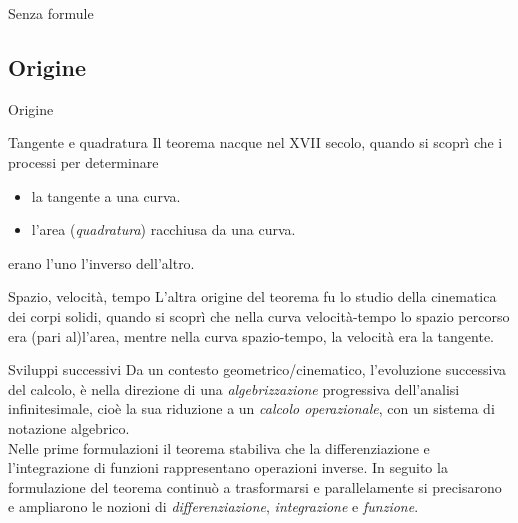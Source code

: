 \documentclass[8pt]{beamer}
\begin{document}
\begin{frame}{Senza formule}
\begin{center}
  \end{center}
\end{frame}

\subsection{Origine}
\begin{frame}{Origine}
  \begin{block}{Tangente e quadratura}
    Il teorema nacque nel XVII secolo, quando si scoprì che i processi per determinare
    \begin{itemize}
      \item
            la tangente a una curva.
      \item
            l'area (\textit{quadratura}) racchiusa da una curva.
    \end{itemize}
    erano l'uno l'inverso dell'altro.
  \end{block}

  \begin{block}{Spazio, velocità, tempo}
    L'altra origine del teorema fu lo studio della cinematica dei corpi solidi,
    quando si scoprì che nella curva velocità-tempo lo spazio percorso era (pari al)l'area,
    mentre nella curva spazio-tempo, la velocità era la tangente. 
  \end{block}

  \pause
  \begin{block}{Sviluppi successivi}
    Da un contesto geometrico/cinematico, l'evoluzione successiva del calcolo, è nella
    direzione di una \textit{algebrizzazione} progressiva dell'analisi infinitesimale,
    cioè la sua riduzione a un \textit{calcolo operazionale}, con un sistema di notazione algebrico.\\
    Nelle prime formulazioni il teorema stabiliva che la differenziazione e l'integrazione di funzioni
    rappresentano operazioni inverse.
    In seguito la formulazione del teorema continuò a trasformarsi e parallelamente
    si precisarono e ampliarono le nozioni di \textit{differenziazione}, \textit{integrazione} e \textit{funzione}.
  \end{block}
\end{frame}
\end{document}
